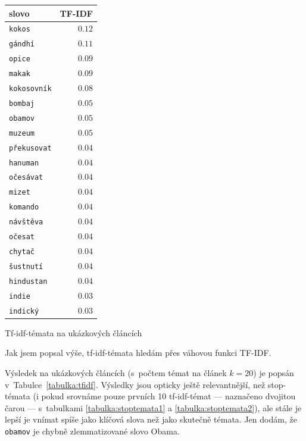 \documentclass[12pt,a4paper]{report}
\begin{document}
{\begin{tabular}{ |l | r | }
      \end{tabular}

} {

    \begin{tabular}{ |l | r | }
        \hline
        \textbf{slovo} & \textbf{TF-IDF} \\ \hline
        
        
        \texttt{kokos} & $0.12$ \\ \hline
        \texttt{gándhí} & $0.11$ \\ \hline
        \texttt{opice} & $0.09$ \\ \hline
        \texttt{makak} & $0.09$ \\ \hline
        \texttt{kokosovník} & $0.08$ \\ \hline
        \texttt{bombaj} & $0.05$ \\ \hline
        \texttt{obamov} & $0.05$ \\ \hline
        \texttt{muzeum} & $0.05$ \\ \hline
        \texttt{překusovat} & $0.04$ \\ \hline
        \texttt{hanuman} & $0.04$ \\ \hline
        \hline
        \texttt{očesávat} & $0.04$ \\ \hline
        \texttt{mizet} & $0.04$ \\ \hline
        \texttt{komando} & $0.04$ \\ \hline
        \texttt{návštěva} & $0.04$ \\ \hline
        \texttt{očesat} & $0.04$ \\ \hline
        \texttt{chytač} & $0.04$ \\ \hline
        \texttt{šustnutí} & $0.04$ \\ \hline
        \texttt{hindustan} & $0.04$ \\ \hline
        \texttt{indie} & $0.03$ \\ \hline
        \texttt{indický} & $0.03$ \\ \hline
        
        
      \end{tabular}


} {Tf-idf-témata na ukázkových článcích}


Jak jsem popsal výše, tf-idf-témata hledám přes váhovou funkci TF-IDF. 

Výsledek na ukázkových článcích (s~počtem témat na článek $k=20$) je popsán v~Tabulce~\ref{tabulka:tfidf}. Výsledky jsou opticky ještě relevantnější, než stop-témata (i pokud srovnáme pouze prvních 10 tf-idf-témat --- naznačeno dvojitou čarou --- s~tabulkami \ref{tabulka:stoptemata1} a \ref{tabulka:stoptemata2}), ale stále je lepší je vnímat spíše jako klíčová slova než jako skutečně témata. Jen dodám, že \texttt{obamov} je chybně zlemmatizované slovo Obama.
\end{document}
